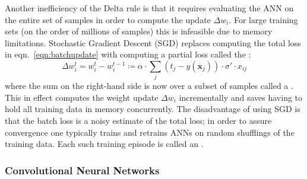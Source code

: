 Another inefficiency of the Delta rule is that it requires evaluating the ANN on the entire set of samples in order to compute the update \(\Delta w_i\).
%
For large training sets (on the order of millions of samples) this is infeasible due to memory limitations.
%
Stochastic Gradient Descent (SGD) replaces computing the total loss in eqn.~\eqref{eqn:batchupdate} with computing a partial loss called the :
\begin{equation}
    \Delta w_i^t = w_i^t - w_i^{t-1} \coloneqq \alpha \cdot \sum_j (t_j-y(\mathbf{x}_j))\cdot \sigma'\cdot x_{ij}
    \label{eqn:sgd}
\end{equation}
where the sum on the right-hand side is now over a subset of samples called a .
%
This in effect computes the weight update \(\Delta w_i\) incrementally and saves having to hold all training data in memory concurrently.
%
The disadvantage of using SGD is that the batch loss is a noisy estimate of the total loss; in order to assure convergence one typically trains and retrains ANNs on random shufflings of the training data.
%
Each such training episode is called an .
%





\subsubsection{Convolutional Neural Networks}




